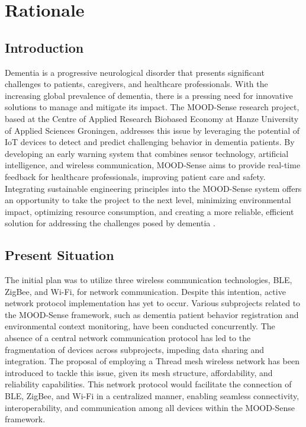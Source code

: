 \chapter{Rationale}\label{chap:rationale}


\section{Introduction}

Dementia is a progressive neurological disorder that presents significant challenges to patients, caregivers, and healthcare professionals. With the increasing global prevalence of dementia, there is a pressing need for innovative solutions to manage and mitigate its impact. The MOOD-Sense research project, based at the Centre of Applied Research Biobased Economy at Hanze University of Applied Sciences Groningen, addresses this issue by leveraging the potential of IoT devices to detect and predict challenging behavior in dementia patients. By developing an early warning system that combines sensor technology, artificial intelligence, and wireless communication, MOOD-Sense aims to provide real-time feedback for healthcare professionals, improving patient care and safety. Integrating sustainable engineering principles into the MOOD-Sense system offers an opportunity to take the project to the next level, minimizing environmental impact, optimizing resource consumption, and creating a more reliable, efficient solution for addressing the challenges posed by dementia \cite{mood-sense_2021}.


\section{Present Situation}

The initial plan was to utilize three wireless communication technologies, BLE, ZigBee, and Wi-Fi, for network communication. Despite this intention, active network protocol implementation has yet to occur. Various subprojects related to the MOOD-Sense framework, such as dementia patient behavior registration and environmental context monitoring, have been conducted concurrently. The absence of a central network communication protocol has led to the fragmentation of devices across subprojects, impeding data sharing and integration. The proposal of employing a Thread mesh wireless network has been introduced to tackle this issue, given its mesh structure, affordability, and reliability capabilities. This network protocol would facilitate the connection of BLE, ZigBee, and Wi-Fi in a centralized manner, enabling seamless connectivity, interoperability, and communication among all devices within the MOOD-Sense framework.



